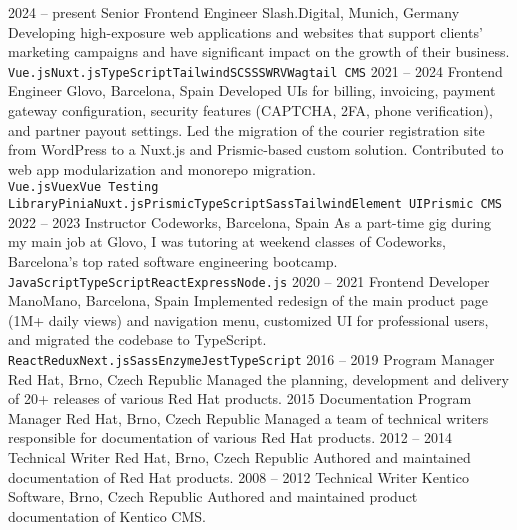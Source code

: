 \documentclass[9pt]{developercv}
\begin{document}

\begin{entrylist}
  \entry
  {2024 --  present}
  {Senior Frontend Engineer}
  {Slash.Digital, Munich, Germany}
  {Developing high-exposure web applications and websites that support clients' marketing campaigns and have significant impact on the growth of their business.\\ \texttt{Vue.js}\slashsep\texttt{Nuxt.js}\slashsep\texttt{TypeScript}\slashsep\texttt{Tailwind}\slashsep\texttt{SCSS}\slashsep\texttt{SWRV}\slashsep\texttt{Wagtail CMS}}
  \entry
  {2021 --  2024}
  {Frontend Engineer}
  {Glovo, Barcelona, Spain}
  {Developed UIs for billing, invoicing, payment gateway configuration, security features (CAPTCHA, 2FA, phone verification), and partner payout settings. Led the migration of the courier registration site from WordPress to a Nuxt.js and Prismic-based custom solution. Contributed to web app modularization and monorepo migration.\\ \texttt{Vue.js}\slashsep\texttt{Vuex}\slashsep\texttt{Vue Testing Library}\slashsep\texttt{Pinia}\slashsep\texttt{Nuxt.js}\slashsep\texttt{Prismic}\slashsep\texttt{TypeScript}\slashsep\texttt{Sass}\slashsep\texttt{Tailwind}\slashsep\texttt{Element UI}\slashsep\texttt{Prismic CMS}}
  \entry
  {2022 --  2023}
  {Instructor}
  {Codeworks, Barcelona, Spain}
  {As a part-time gig during my main job at Glovo, I was tutoring at weekend classes of Codeworks, Barcelona’s top rated software engineering bootcamp.\\ \texttt{JavaScript}\slashsep\texttt{TypeScript}\slashsep\texttt{React}\slashsep\texttt{Express}\slashsep\texttt{Node.js}}
  \entry
  {2020 -- 2021}
  {Frontend Developer}
  {ManoMano, Barcelona, Spain}
  {Implemented redesign of the main product page (1M+ daily views) and navigation menu, customized UI for professional users, and migrated the codebase to TypeScript.\\ \texttt{React}\slashsep\texttt{Redux}\slashsep\texttt{Next.js}\slashsep\texttt{Sass}\slashsep\texttt{Enzyme}\slashsep\texttt{Jest}\slashsep\texttt{TypeScript}}
  \entry
  {2016 -- 2019}
  {Program Manager}
  {Red Hat, Brno, Czech Republic}
  {Managed the planning, development and delivery of 20+ releases of various Red Hat products. }
  \entry
  {2015}
  {Documentation Program Manager}
  {Red Hat, Brno, Czech Republic}
  {Managed a team of technical writers responsible for documentation of various Red Hat products. }
  \entry
  {2012 -- 2014}
  {Technical Writer}
  {Red Hat, Brno, Czech Republic}
  {Authored and maintained documentation of Red Hat products. }
  \entry
  {2008 -- 2012}
  {Technical Writer}
  {Kentico Software, Brno, Czech Republic}
  {Authored and maintained product documentation of Kentico CMS. }
\end{entrylist}
\end{document}
